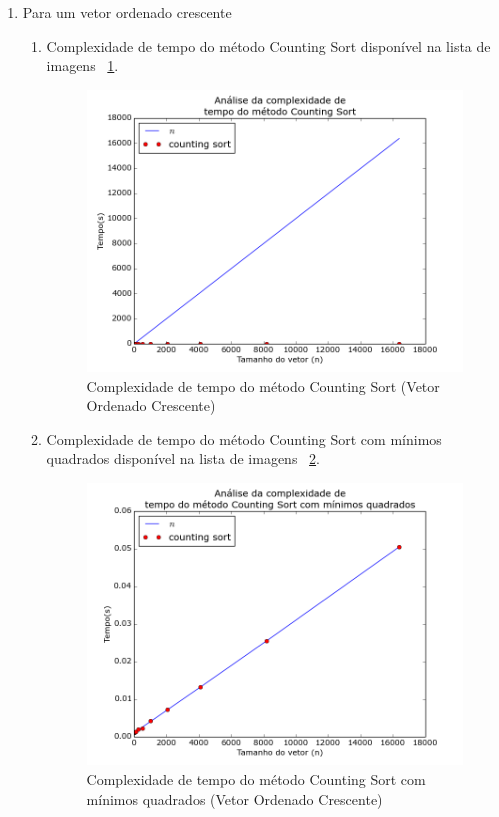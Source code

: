 \documentclass[12pt,a4paper,twoside]{report}
\begin{document}
\begin{enumerate}
\begin{enumerate}
	\end{enumerate}

	\item Para um vetor ordenado crescente
		\begin{enumerate}

			\item Complexidade de tempo do método Counting Sort disponível na lista de imagens ~\ref{fig:CountingPlot2OC}.
			\begin{figure}[!h]
				\centering
				\includegraphics[scale=0.6]{../imagens/Counting/counting_plot_2_ordenado_crescente.png}
				\caption{Complexidade de tempo do método Counting Sort (Vetor Ordenado Crescente) \label{fig:CountingPlot2OC}}
			\end{figure}


			\item Complexidade de tempo do método Counting Sort com mínimos quadrados disponível na lista de imagens ~\ref{fig:CountingPlot3OC}.
			\begin{figure}[!h]
				\centering
				\includegraphics[scale=0.6]{../imagens/Counting/counting_plot_3_ordenado_crescente.png}
				\caption{Complexidade de tempo do método Counting Sort com mínimos quadrados (Vetor Ordenado Crescente) \label{fig:CountingPlot3OC}}
			\end{figure}


\end{enumerate}
\end{enumerate}
\end{document}

